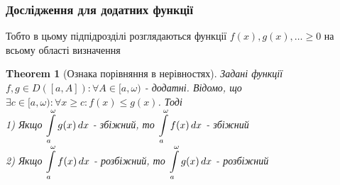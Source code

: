 \documentclass[a4paper, 14pt]{extarticle}
\def\huge{\displaystyle}
\theoremstyle{theoremdd}
\newtheorem{theorem}{Theorem}[subsection]
\theoremstyle{theoremdd}
\theoremstyle{theoremdd}
\theoremstyle{theoremdd}
\theoremstyle{theoremdd}
\theoremstyle{theoremdd}
\theoremstyle{theoremdd}
\theoremstyle{theoremdd}
\begin{document}
\subsubsection{Дослідження для додатних функції}
Тобто в цьому підпідрозділі розглядаються функції $f(x), g(x), \dots \geq 0$ на всьому області визначення
\begin{theorem}[Ознака порівняння в нерівностях]
Задані функції $f,g \in D([a,A]): \forall A \in [a,\omega)$ - додатні. Відомо, що\\
$\exists c \in [a,\omega): \forall x \geq c: f(x) \leq g(x)$. Тоді\\
1) Якщо $\huge\int\displaylimits_a^\omega g(x)\,dx$ - збіжний, то $\huge\int\displaylimits_a^\omega f(x)\,dx$ - збіжний\\
2) Якщо $\huge\int\displaylimits_a^\omega f(x)\,dx$ - розбіжний, то $\huge\int\displaylimits_a^\omega g(x)\,dx$ - розбіжний\\
\end{theorem}
\end{document}
